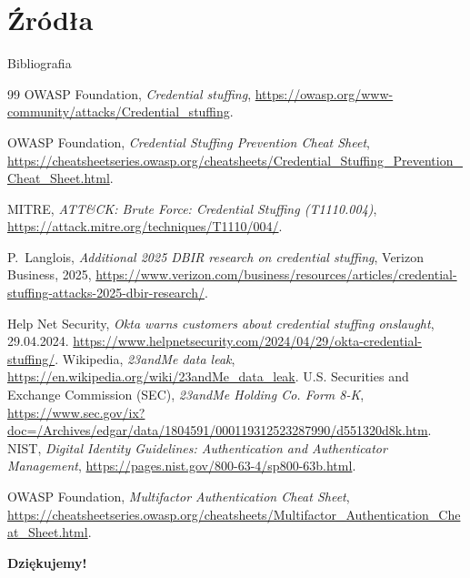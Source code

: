 \documentclass[aspectratio=169,xcolor=dvipsnames]{beamer}
\begin{document}
\section{Źródła}
\begin{frame}{Bibliografia}
    \scriptsize
    \begin{thebibliography}{99}
         OWASP Foundation, \emph{Credential stuffing},
            \url{https://owasp.org/www-community/attacks/Credential_stuffing}.

         OWASP Foundation, \emph{Credential Stuffing Prevention Cheat Sheet},
            \url{https://cheatsheetseries.owasp.org/cheatsheets/Credential_Stuffing_Prevention_Cheat_Sheet.html}.

         MITRE, \emph{ATT\&CK: Brute Force: Credential Stuffing (T1110.004)},
            \url{https://attack.mitre.org/techniques/T1110/004/}.

         P.~Langlois, \emph{Additional 2025 DBIR research on credential stuffing},
            Verizon Business, 2025,
            \url{https://www.verizon.com/business/resources/articles/credential-stuffing-attacks-2025-dbir-research/}.

         Help Net Security, \emph{Okta warns customers about credential stuffing
            onslaught}, 29.04.2024.
            \url{https://www.helpnetsecurity.com/2024/04/29/okta-credential-stuffing/}.
         Wikipedia, \emph{23andMe data leak}, 
            \url{https://en.wikipedia.org/wiki/23andMe_data_leak}.
         U.S. Securities and Exchange Commission (SEC), \emph{23andMe Holding Co. Form 8-K}, 
            \url{https://www.sec.gov/ix?doc=/Archives/edgar/data/1804591/000119312523287990/d551320d8k.htm}.
         NIST, \emph{Digital Identity Guidelines: Authentication and Authenticator Management},
            \url{https://pages.nist.gov/800-63-4/sp800-63b.html}.

         OWASP Foundation, \emph{Multifactor Authentication Cheat Sheet},
            \url{https://cheatsheetseries.owasp.org/cheatsheets/Multifactor_Authentication_Cheat_Sheet.html}.
    \end{thebibliography}
\end{frame}


\begin{frame}[plain]
    \centering
    {\Huge\bfseries\color{CyberRed} Dziękujemy!}
\end{frame}
\end{document}
